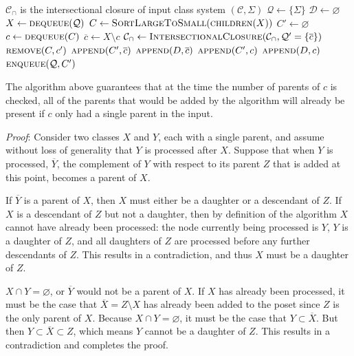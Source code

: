 \documentclass[11pt, oneside]{article}   	%
\begin{document}
\vspace{\baselineskip} \noindent \begin{algorithmic}
	\REQUIRE $\mathcal C_\cap$ is the intersectional closure of input class system $(\mathcal C, \Sigma)$
	\STATE
	\STATE $\mathcal Q \leftarrow \{\Sigma\}$
	\STATE $\mathcal D \leftarrow \varnothing$
	\STATE
	\STATE $X \leftarrow \textsc{dequeue}(\mathcal Q)$
	\STATE $C \leftarrow \textsc{SortLargeToSmall}(\textsc{children}(X))$
	\STATE $C' \leftarrow \varnothing$
	\STATE $c \leftarrow \textsc{dequeue}(C)$
	\STATE $\overline{c} \leftarrow X \setminus c$
	\STATE $\mathcal C_\cap \leftarrow \textsc{IntersectionalClosure}(\mathcal C_\cap, \mathcal Q' = \{\overline{c}\})$
		\STATE $\textsc{remove}(C, c')$
	\ENDIF
	\STATE $\textsc{append}(C', \overline{c})$
	\STATE $\textsc{append}(D, \overline{c})$
	\ENDFOR
	\STATE $\textsc{append}(C', c)$
	\STATE $\textsc{append}(D, c)$
	\ENDIF
	\ENDWHILE
	\STATE $\textsc{enqueue}(\mathcal{Q}, C')$
	\ENDWHILE
\end{algorithmic}

The algorithm above guarantees that at the time the number of parents of $c$ is checked, all of the parents that would be added by the algorithm will already be present if $c$ only had a single parent in the input.

\vspace{\baselineskip} \noindent \textit{Proof}: 
Consider two classes $X$ and $Y$, each with a single parent, and assume without loss of generality that $Y$ is processed after $X$. Suppose that when $Y$ is processed, $\overline{Y}$, the complement of $Y$ with respect to its parent $Z$ that is added at this point, becomes a parent of $X$.

If $\overline{Y}$ is a parent of $X$, then $X$ must either be a daughter or a descendant of $Z$. If $X$ is a descendant of $Z$ but not a daughter, then by definition of the algorithm $X$ cannot have already been processed: the node currently being processed is $Y$, $Y$ is a daughter of $Z$, and all daughters of $Z$ are processed before any further descendants of $Z$. This results in a contradiction, and thus $X$ must be a daughter of $Z$.

$X \cap Y = \varnothing$, or $\overline{Y}$ would not be a parent of $X$. If $X$ has already been processed, it must be the case that $\overline{X} = Z \setminus X$ has already been added to the poset since $Z$ is the only parent of $X$. Because $X \cap Y = \varnothing$, it must be the case that $Y \subset \overline{X}$. But then $Y \subset \overline{X} \subset Z$, which means $Y$ cannot be a daughter of $Z$. This results in a contradiction and completes the proof.
\end{document}
